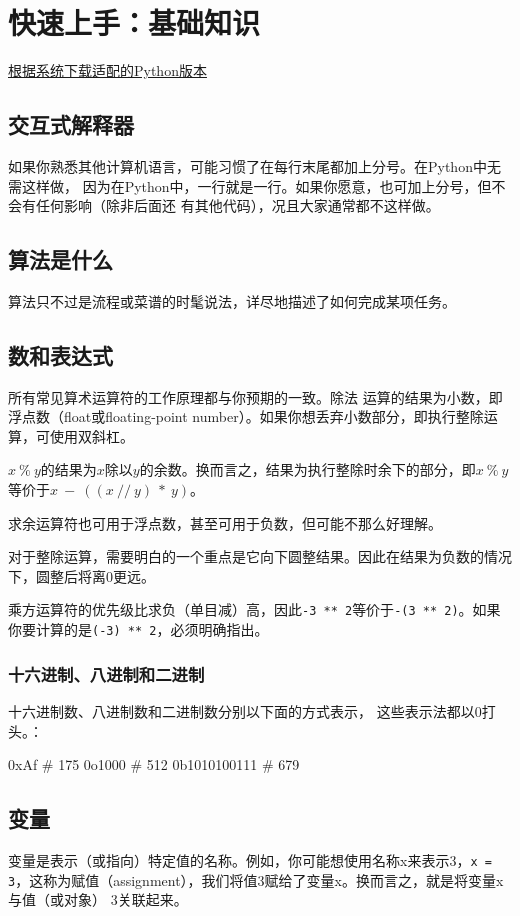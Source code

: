 \chapter{快速上手：基础知识}
\href{www.python.org}{根据系统下载适配的Python版本}
\section{交互式解释器}
如果你熟悉其他计算机语言，可能习惯了在每行末尾都加上分号。在Python中无需这样做，
因为在Python中，一行就是一行。如果你愿意，也可加上分号，但不会有任何影响（除非后面还
有其他代码），况且大家通常都不这样做。
\section{算法是什么}
算法只不过是流程或菜谱的时髦说法，详尽地描述了如何完成某项任务。
\section{数和表达式}
所有常见算术运算符的工作原理都与你预期的一致。除法
运算的结果为小数，即浮点数（float或floating-point number）。如果你想丢弃小数部分，即执行整除运算，可使用双斜杠。

$x~\%~ y$的结果为$x$除以$y$的余数。换而言之，结果为执行整除时余下的部分，即$x~\%~ y$等价于$x~-~ ((x ~//~ y)~ *~ y)$。

求余运算符也可用于浮点数，甚至可用于负数，但可能不那么好理解。

对于整除运算，需要明白的一个重点是它向下圆整结果。因此在结果为负数的情况下，圆整后将离0更远。

乘方运算符的优先级比求负（单目减）高，因此\verb|-3 ** 2|等价于\verb|-(3 ** 2)|。如果你要计算的是\verb|(-3) ** 2|，必须明确指出。

\subsection{十六进制、八进制和二进制}
十六进制数、八进制数和二进制数分别以下面的方式表示， 这些表示法都以0打头。：
\begin{pyc}
0xAf # 175
0o1000 # 512
0b1010100111 # 679
\end{pyc}
\section{变量}
变量是表示（或指向）特定值的名称。例如，你可能想使用名称x来表示3，\verb|x = 3|，这称为赋值（assignment），我们将值3赋给了变量x。换而言之，就是将变量x与值（或对象）
3关联起来。

